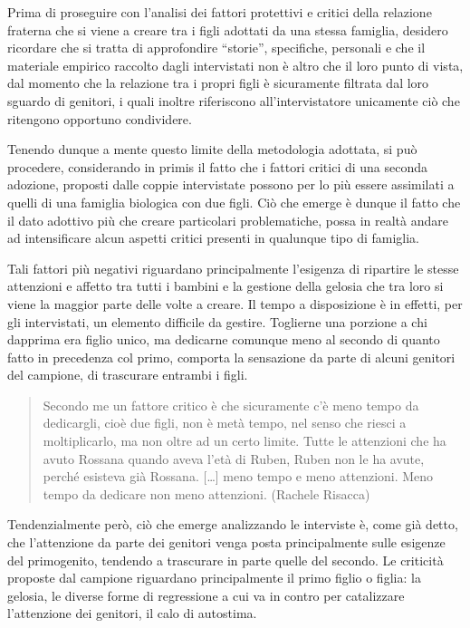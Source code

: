 \documentclass[12pt,oneside,svgnames]{memoir}
\newenvironment{quotationb}%
{\color{maincolor}\begin{leftbar}\begin{quotation}}%
{\end{quotation}\end{leftbar}\ignorespacesafterend}
\begin{document}
Prima di proseguire con l'analisi dei fattori protettivi e critici della
relazione fraterna che si viene a creare tra i figli adottati da una
stessa famiglia, desidero ricordare che si tratta di approfondire
``storie'', specifiche, personali e che il materiale empirico raccolto
dagli intervistati non è altro che il loro punto di vista, dal momento
che la relazione tra i propri figli è sicuramente filtrata dal loro
sguardo di genitori, i quali inoltre riferiscono all'intervistatore
unicamente ciò che ritengono opportuno condividere.

Tenendo dunque a mente questo limite della metodologia adottata, si può
procedere, considerando in primis il fatto che i fattori critici di una
seconda adozione, proposti dalle coppie intervistate possono per lo più
essere assimilati a quelli di una famiglia biologica con due figli. Ciò
che emerge è dunque il fatto che il dato adottivo più che creare
particolari problematiche, possa in realtà andare ad intensificare alcun
aspetti critici presenti in qualunque tipo di famiglia.

Tali fattori più negativi riguardano principalmente l'esigenza di
ripartire le stesse attenzioni e affetto tra tutti i bambini e la
gestione della gelosia che tra loro si viene la maggior parte delle
volte a creare. Il tempo a disposizione è in effetti, per gli
intervistati, un elemento difficile da gestire. Toglierne una porzione a
chi dapprima era figlio unico, ma dedicarne comunque meno al secondo di
quanto fatto in precedenza col primo, comporta la sensazione da parte di
alcuni genitori del campione, di trascurare entrambi i figli.

\begin{quotationb}
Secondo me un fattore critico è che sicuramente c'è meno tempo da
dedicargli, cioè due figli, non è metà tempo, nel senso che riesci a
moltiplicarlo, ma non oltre ad un certo limite. Tutte le attenzioni che
ha avuto Rossana quando aveva l'età di Ruben, Ruben non le ha avute,
perché esisteva già Rossana. {[}\ldots{}{]} meno tempo e meno
attenzioni. Meno tempo da dedicare non meno attenzioni. (Rachele
Risacca)
\end{quotationb}

Tendenzialmente però, ciò che emerge analizzando le interviste è, come
già detto, che l'attenzione da parte dei genitori venga posta
principalmente sulle esigenze del primogenito, tendendo a trascurare in
parte quelle del secondo. Le criticità proposte dal campione riguardano
principalmente il primo figlio o figlia: la gelosia, le diverse forme di
regressione a cui va in contro per catalizzare l'attenzione dei
genitori, il calo di autostima.
\end{document}
